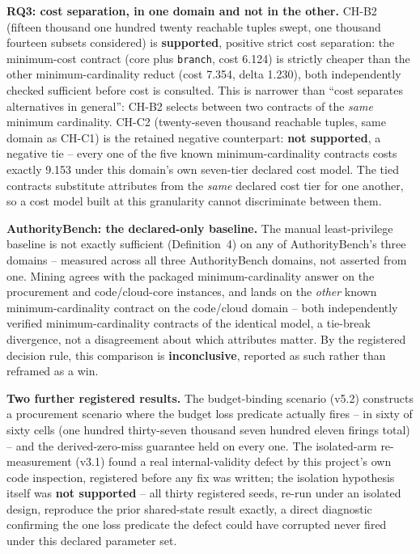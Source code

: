 \documentclass[11pt,a4paper]{article}
\theoremstyle{definition}
\begin{document}
\noindent\textbf{RQ3: cost separation, in one domain and not in the other.} CH-B2 (fifteen thousand one hundred twenty reachable tuples swept, one thousand fourteen subsets considered) is \textbf{supported}, positive strict cost separation: the minimum-cost contract (core plus \texttt{branch}, cost 6.124) is strictly cheaper than the other minimum-cardinality reduct (cost 7.354, delta 1.230), both independently checked sufficient before cost is consulted. This is narrower than ``cost separates alternatives in general'': CH-B2 selects between two contracts of the \emph{same} minimum cardinality. CH-C2 (twenty-seven thousand reachable tuples, same domain as CH-C1) is the retained negative counterpart: \textbf{not supported}, a negative tie -- every one of the five known minimum-cardinality contracts costs exactly 9.153 under this domain's own seven-tier declared cost model. The tied contracts substitute attributes from the \emph{same} declared cost tier for one another, so a cost model built at this granularity cannot discriminate between them.

\noindent\textbf{AuthorityBench: the declared-only baseline.} The manual least-privilege baseline is not exactly sufficient (Definition~4) on any of AuthorityBench's three domains -- measured across all three AuthorityBench domains, not asserted from one. Mining agrees with the packaged minimum-cardinality answer on the procurement and code/cloud-core instances, and lands on the \emph{other} known minimum-cardinality contract on the code/cloud domain -- both independently verified minimum-cardinality contracts of the identical model, a tie-break divergence, not a disagreement about which attributes matter. By the registered decision rule, this comparison is \textbf{inconclusive}, reported as such rather than reframed as a win.

\noindent\textbf{Two further registered results.} The budget-binding scenario (v5.2) constructs a procurement scenario where the budget loss predicate actually fires -- in sixty of sixty cells (one hundred thirty-seven thousand seven hundred eleven firings total) -- and the derived-zero-miss guarantee held on every one. The isolated-arm re-measurement (v3.1) found a real internal-validity defect by this project's own code inspection, registered before any fix was written; the isolation hypothesis itself was \textbf{not supported} -- all thirty registered seeds, re-run under an isolated design, reproduce the prior shared-state result exactly, a direct diagnostic confirming the one loss predicate the defect could have corrupted never fired under this declared parameter set.
\end{document}
